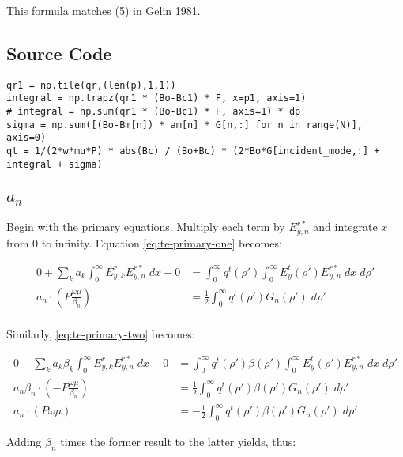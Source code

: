 \documentclass[11pt, oneside]{article}   	%
\begin{document}
\noindent This formula matches (5) in Gelin 1981.

\subsection{Source Code}

\begin{lstlisting}
qr1 = np.tile(qr,(len(p),1,1))
integral = np.trapz(qr1 * (Bo-Bc1) * F, x=p1, axis=1)
# integral = np.sum(qr1 * (Bo-Bc1) * F, axis=1) * dp
sigma = np.sum([(Bo-Bm[n]) * am[n] * G[n,:] for n in range(N)], axis=0)
qt = 1/(2*w*mu*P) * abs(Bc) / (Bo+Bc) * (2*Bo*G[incident_mode,:] + integral + sigma)
\end{lstlisting}


\subsection{$a_{n}$}

Begin with the primary equations. Multiply each term by $E_{y,n}^{r*}$ and integrate $x$ from 0 to infinity. Equation \eqref{eq:te-primary-one} becomes:

\begin{align*}
0 + \sum_{k} a_{k} \int_{0}^{\infty} E_{y,k}^{r} E_{y,n}^{r*} \; dx + 0 &= \int_{0}^{\infty} q^{t} (\rho ') \int_{0}^{\infty} E_{y}^{t}(\rho ') E_{y,n}^{r*} \; dx \; d\rho ' \\
a_{n} \cdot \left( P \frac{\omega \mu}{\beta_{n}} \right) &= \frac{1}{2} \int_{0}^{\infty} q^{t} (\rho ') G_{n} (\rho ') \; d\rho' \\
\end{align*}

\noindent Similarly, \eqref{eq:te-primary-two} becomes:

\begin{align*}
0 - \sum_{k} a_{k}\beta_{k} \int_{0}^{\infty} E_{y,k}^{r} E_{y,n}^{r*} \; dx + 0 &= \int_{0}^{\infty} q^{t} (\rho ') \beta (\rho ') \int_{0}^{\infty} E_{y}^{t}(\rho ') E_{y,n}^{r*} \; dx \; d\rho ' \\
a_{n} \beta_{n} \cdot \left( -P \frac{\omega \mu}{\beta_{n}} \right) &= \frac{1}{2} \int_{0}^{\infty} q^{t} (\rho ') \beta(\rho ')G_{n} (\rho ') \; d\rho' \\
a_{n} \cdot \left( P \omega \mu \right) &= -\frac{1}{2} \int_{0}^{\infty} q^{t} (\rho ') \beta(\rho ') G_{n} (\rho ') \; d\rho'
\end{align*}

\noindent

Adding $\beta_{n}$ times the former result to the latter yields, thus:
\end{document}
